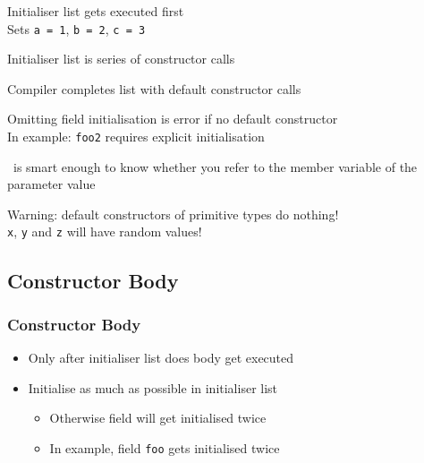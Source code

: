 \begin{frame}
\begin{overprint}
  \end{overprint}

  \begin{overprint}
    \begin{center}
      Initialiser list gets executed first \\
      Sets \texttt{a = 1}, \texttt{b = 2}, \texttt{c = 3}
    \end{center}

    \begin{center}
      Initialiser list is series of constructor calls
    \end{center}

    \begin{center}
      Compiler completes list with default constructor calls
    \end{center}

    \begin{center}
      Omitting field initialisation is error if no default constructor \\
      In example: \texttt{foo2} requires explicit initialisation
    \end{center}

    \begin{center}
      \cpp\ is smart enough to know whether you refer to the member
      variable of the parameter value
    \end{center}

    \begin{center}
      Warning: default constructors of primitive types do nothing! \\
      \texttt{x}, \texttt{y} and \texttt{z} will have random values!
    \end{center}
  \end{overprint}
\end{frame}

\subsection{Constructor Body}
\frame{\tableofcontents[currentsubsection]}

\begin{frame}
  \frametitle{Constructor Body}
  \begin{itemize}
    \item Only after initialiser list does body get executed
    \item Initialise as much as possible in initialiser list
          \begin{itemize}
            \item Otherwise field will get initialised twice
            \item In example, field \texttt{foo} gets initialised twice
          \end{itemize}
  \end{itemize}
\end{frame}

